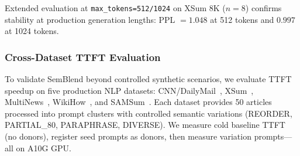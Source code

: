 \documentclass[10pt,twocolumn]{article}
\begin{document}
Extended evaluation at \texttt{max\_tokens=512/1024}
on XSum 8K ($n{=}8$) confirms stability at production generation lengths:
PPL $= 1.048$ at 512 tokens and $0.997$ at 1024 tokens.

\subsubsection{Cross-Dataset TTFT Evaluation}
\label{sec:cross-dataset}

To validate SemBlend beyond controlled synthetic scenarios, we evaluate
TTFT speedup on five production NLP datasets: CNN/DailyMail~\cite{cnn_dailymail},
XSum~\cite{xsum}, MultiNews~\cite{multinews}, WikiHow~\cite{wikihow}, and
SAMSum~\cite{samsum}. Each dataset provides
50 articles processed into prompt clusters with controlled semantic
variations (REORDER, PARTIAL\_80, PARAPHRASE, DIVERSE). We measure
cold baseline TTFT (no donors), register seed prompts as donors, then
measure variation prompts---all on A10G GPU.
\end{document}
